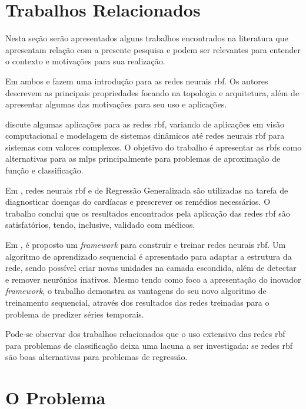 \documentclass[conference]{IEEEtran}
\begin{document}
\section{Trabalhos Relacionados}
\label{relacionados}
Nesta seção serão apresentados alguns trabalhos encontrados na literatura que 
apresentam relação com a presente pesquisa e podem ser relevantes para entender 
o contexto e motivações para sua realização.

Em ambos \cite{orr1996introduction} e \cite{borsintroduction} fazem uma 
introdução para as redes neurais \ac*{rbf}. Os autores descrevem as principais 
propriedades focando na topologia e arquitetura, além de apresentar algumas das 
motivações para seu uso e aplicações.

\cite{wu2012using} discute algumas aplicações para as redes \ac*{rbf}, variando 
de aplicações em visão computacional e modelagem de sistemas dinâmicos até 
redes neurais \ac*{rbf} para sistemas com valores complexos. O objetivo do 
trabalho é apresentar as \acp*{rbf} como alternativas para as \acp*{mlp} 
principalmente para problemas de aproximação de função e classificação.

Em \cite{heartrbf}, redes neurais \ac*{rbf} e de Regressão Generalizada são 
utilizadas na tarefa de diagnosticar doenças do cardíacas e prescrever os 
remédios necessários. O trabalho conclui que os resultados encontrados pela 
aplicação das redes \ac*{rbf} são satisfatórios, tendo, inclusive, validado 
com médicos.

Em \cite{rojas2002time}, é proposto um \textit{framework} para construir e 
treinar redes neurais \ac*{rbf}. Um algoritmo de aprendizado sequencial é 
apresentado para adaptar a estrutura da rede, sendo possível criar novas 
unidades na camada escondida, além de detectar e remover neurônios inativos.
Mesmo tendo como foco a apresentação do inovador \textit{framework}, o trabalho 
demonstra as vantagens do seu novo algoritmo de treinamento sequencial, através 
dos resultados das redes treinadas para o problema de predizer séries temporais.

Pode-se observar dos trabalhos relacionados que o uso extensivo das redes 
\ac*{rbf} para problemas de classificação deixa uma lacuna a ser investigada: 
se redes \ac*{rbf} são boas alternativas para problemas de regressão.

\section{O Problema}
\label{problema}
\end{document}
